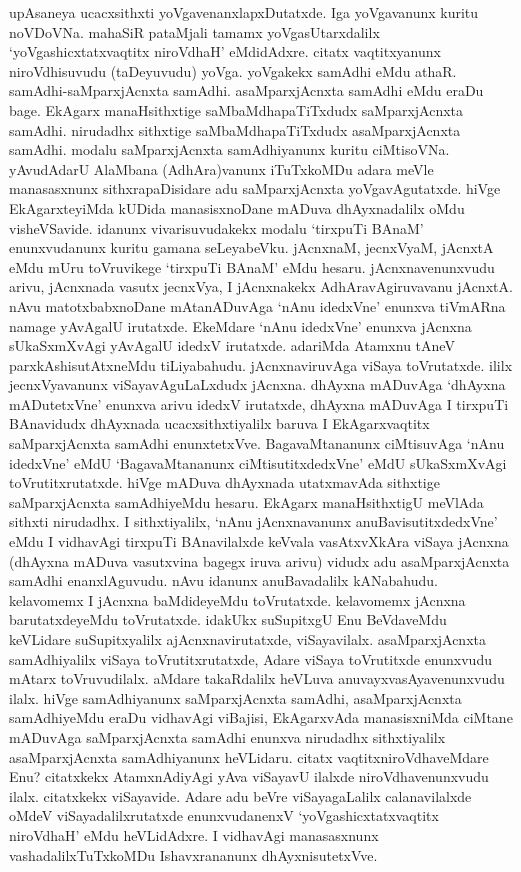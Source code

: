 upAsaneya ucacxsithxti yoVgavenanxlapxDutatxde. Iga yoVgavanunx kuritu noVDoVNa. mahaSiR pataMjali tamamx yoVgasUtarxdalilx `yoVgashicxtatxvaqtitx niroVdhaH' eMdidAdxre. citatx vaqtitxyanunx niroVdhisuvudu (taDeyuvudu) yoVga. yoVgakekx samAdhi eMdu athaR. samAdhi-saMparxjAcnxta samAdhi. asaMparxjAcnxta samAdhi eMdu eraDu bage. EkAgarx manaHsithxtige saMbaMdhapaTiTxdudx saMparxjAcnxta samAdhi. nirudadhx sithxtige saMbaMdhapaTiTxdudx asaMparxjAcnxta samAdhi. modalu saMparxjAcnxta samAdhiyanunx kuritu ciMtisoVNa. yAvudAdarU AlaMbana (AdhAra)vanunx iTuTxkoMDu adara meVle manasasxnunx sithxrapaDisidare adu saMparxjAcnxta yoVgavAgutatxde. hiVge EkAgarxteyiMda kUDida manasisxnoDane mADuva dhAyxnadalilx oMdu visheVSavide. idanunx vivarisuvudakekx modalu `tirxpuTi BAnaM' enunxvudanunx kuritu gamana seLeyabeVku. jAcnxnaM, jecnxVyaM, jAcnxtA eMdu mUru toVruvikege `tirxpuTi BAnaM' eMdu hesaru. jAcnxnavenunxvudu arivu, jAcnxnada vasutx jecnxVya, I jAcnxnakekx AdhAravAgiruvavanu jAcnxtA. nAvu matotxbabxnoDane mAtanADuvAga `nAnu idedxVne' enunxva tiVmARna namage yAvAgalU irutatxde. EkeMdare `nAnu idedxVne' enunxva jAcnxna sUkaSxmXvAgi yAvAgalU idedxV irutatxde. adariMda Atamxnu tAneV parxkAshisutAtxneMdu tiLiyabahudu. jAcnxnaviruvAga viSaya toVrutatxde. ililx jecnxVyavanunx viSayavAguLaLxdudx jAcnxna. dhAyxna mADuvAga `dhAyxna mADutetxVne' enunxva arivu idedxV irutatxde, dhAyxna mADuvAga I tirxpuTi BAnavidudx dhAyxnada ucacxsithxtiyalilx baruva I EkAgarxvaqtitx saMparxjAcnxta samAdhi enunxtetxVve. BagavaMtananunx ciMtisuvAga `nAnu idedxVne' eMdU `BagavaMtananunx ciMtisutitxdedxVne' eMdU sUkaSxmXvAgi toVrutitxrutatxde. hiVge mADuva dhAyxnada utatxmavAda sithxtige saMparxjAcnxta samAdhiyeMdu hesaru. EkAgarx manaHsithxtigU meVlAda sithxti nirudadhx. I sithxtiyalilx, `nAnu jAcnxnavanunx anuBavisutitxdedxVne' eMdu I vidhavAgi tirxpuTi BAnavilalxde keVvala vasAtxvXkAra viSaya jAcnxna (dhAyxna mADuva vasutxvina bagegx iruva arivu) vidudx adu asaMparxjAcnxta samAdhi enanxlAguvudu. nAvu idanunx anuBavadalilx kANabahudu. kelavomemx I jAcnxna baMdideyeMdu toVrutatxde. kelavomemx jAcnxna barutatxdeyeMdu toVrutatxde. idakUkx suSupitxgU Enu BeVdaveMdu keVLidare suSupitxyalilx ajAcnxnavirutatxde, viSayavilalx. asaMparxjAcnxta samAdhiyalilx viSaya toVrutitxrutatxde, Adare viSaya toVrutitxde enunxvudu mAtarx toVruvudilalx. aMdare takaRdalilx heVLuva anuvayxvasAyavenunxvudu ilalx. hiVge samAdhiyanunx saMparxjAcnxta samAdhi, asaMparxjAcnxta samAdhiyeMdu eraDu vidhavAgi viBajisi, EkAgarxvAda manasisxniMda ciMtane mADuvAga saMparxjAcnxta samAdhi enunxva nirudadhx sithxtiyalilx asaMparxjAcnxta samAdhiyanunx heVLidaru. citatx vaqtitxniroVdhaveMdare Enu? citatxkekx AtamxnAdiyAgi yAva viSayavU ilalxde niroVdhavenunxvudu ilalx. citatxkekx viSayavide. Adare adu beVre viSayagaLalilx calanavilalxde oMdeV viSayadalilxrutatxde enunxvudanenxV `yoVgashicxtatxvaqtitx niroVdhaH' eMdu heVLidAdxre. I vidhavAgi manasasxnunx vashadalilxTuTxkoMDu Ishavxrananunx dhAyxnisutetxVve.

